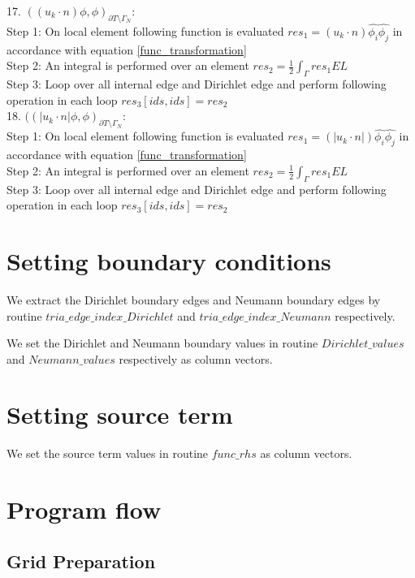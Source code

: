 \documentclass[a4paper,12pt]{book}
\begin{document}
17. $((u_k \cdot n)\phi,\phi)_{\partial T \setminus \Gamma_N}$:\\
Step 1: On local element following function is evaluated $res_1 = (u_k \cdot n) \hat{\phi_i} \hat{\phi_j} $ in accordance with equation \ref{func_transformation}\\
Step 2: An integral is performed over an element $res_2 = \frac{1}{2} \int_{\Gamma} res_1 EL $\\
Step 3: Loop over all internal edge and Dirichlet edge and perform following operation in each loop $res_3[ids,ids] = res_2$\\

18. $((|u_k \cdot n| \phi,\phi)_{\partial T \setminus \Gamma_N}$:\\
Step 1: On local element following function is evaluated $res_1 = (|u_k \cdot n|) \hat{\phi_i} \hat{\phi_j} $ in accordance with equation \ref{func_transformation}\\
Step 2: An integral is performed over an element $res_2 = \frac{1}{2} \int_{\Gamma} res_1 EL $\\
Step 3: Loop over all internal edge and Dirichlet edge and perform following operation in each loop $res_3[ids,ids] = res_2$\\

\section{Setting boundary conditions}

We extract the Dirichlet boundary edges and Neumann boundary edges by routine $tria\_edge\_index\_Dirichlet$ and $tria\_edge\_index\_Neumann$ respectively.

We set the Dirichlet and Neumann boundary values in routine $Dirichlet\_values$ and $Neumann\_values$ respectively as column vectors. 

\section{Setting source term}

We set the source term values in routine $func\_rhs$ as column vectors. 

\section{Program flow}

\subsection{Grid Preparation}
\end{document}
